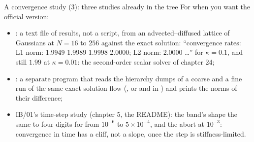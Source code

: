\documentclass[aspectratio=169,11pt]{beamer}
\begin{document}
\begin{frame}{A convergence study (3): three studies already in the tree}
\label{fr:conv3}
\footnotesize For when you want the official version:
\begin{itemize}\footnotesize
  \item {}: a text file of results, not a script, from an advected--diffused lattice of Gaussians at $N = 16$ to $256$ against the exact solution: ``convergence rates: L1-norm: 1.9949 1.9989 1.9998 2.0000; L2-norm: 2.0000 \ldots'' for $\kappa = 0.1$, and still $1.99$ at $\kappa = 0.01$: the second-order scalar solver of chapter 24;
  \item {}: a separate program that reads the hierarchy dumps of a coarse and a fine run of the same exact-solution flow (, or  and  in ) and prints the norms of their difference;
  \item IB/01's time-step study (chapter 5, the README): the band's shape the same to four digits for  from $10^{-6}$ to $5\times10^{-4}$, and the abort at $10^{-3}$: convergence in time has a cliff, not a slope, once the step is stiffness-limited.
\end{itemize}
\end{frame}
\end{document}
